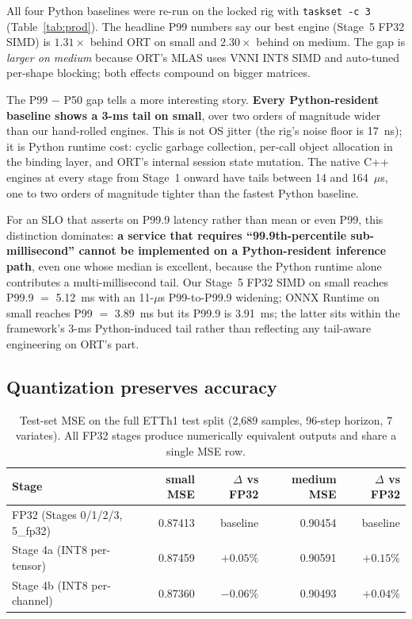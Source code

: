 \documentclass{article}
\begin{document}
All four Python baselines were re-run on the locked rig with \texttt{taskset -c 3} (Table~\ref{tab:prod}).
The headline P99 numbers say our best engine (Stage~5 FP32 SIMD) is $1.31\times$ behind ORT on small and $2.30\times$ behind on medium.
The gap is \emph{larger on medium} because ORT's MLAS uses VNNI INT8 SIMD and auto-tuned per-shape blocking; both effects compound on bigger matrices.

The P99 $-$ P50 gap tells a more interesting story.
\textbf{Every Python-resident baseline shows a 3-ms tail on small}, over two orders of magnitude wider than our hand-rolled engines.
This is not OS jitter (the rig's noise floor is 17~ns); it is Python runtime cost: cyclic garbage collection, per-call object allocation in the binding layer, and ORT's internal session state mutation.
The native C++ engines at every stage from Stage~1 onward have tails between 14 and 164~$\mu$s, one to two orders of magnitude tighter than the fastest Python baseline.

For an SLO that asserts on P99.9 latency rather than mean or even P99, this distinction dominates: \textbf{a service that requires ``99.9th-percentile sub-millisecond'' cannot be implemented on a Python-resident inference path}, even one whose median is excellent, because the Python runtime alone contributes a multi-millisecond tail.
Our Stage~5 FP32 SIMD on small reaches P99.9 $=$ 5.12~ms with an 11-$\mu$s P99-to-P99.9 widening; ONNX Runtime on small reaches P99 $=$ 3.89~ms but its P99.9 is 3.91~ms; the latter sits within the framework's 3-ms Python-induced tail rather than reflecting any tail-aware engineering on ORT's part.

\subsection{Quantization preserves accuracy}
\label{sec:mse}

\begin{table}[t]
\centering
\caption{Test-set MSE on the full ETTh1 test split (2{,}689 samples, 96-step horizon, 7 variates). All FP32 stages produce numerically equivalent outputs and share a single MSE row.}
\label{tab:mse}
\small
\begin{tabular}{lrrrr}
\toprule
Stage & small MSE & $\Delta$ vs FP32 & medium MSE & $\Delta$ vs FP32 \\
\midrule
FP32 (Stages 0/1/2/3, 5\_fp32)  & 0.87413 & baseline & 0.90454 & baseline \\
Stage 4a (INT8 per-tensor)      & 0.87459 & $\mathbf{+0.05\%}$ & 0.90591 & $\mathbf{+0.15\%}$ \\
Stage 4b (INT8 per-channel)     & 0.87360 & $\mathbf{-0.06\%}$ & 0.90493 & $\mathbf{+0.04\%}$ \\
\bottomrule
\end{tabular}
\end{table}
\end{document}
